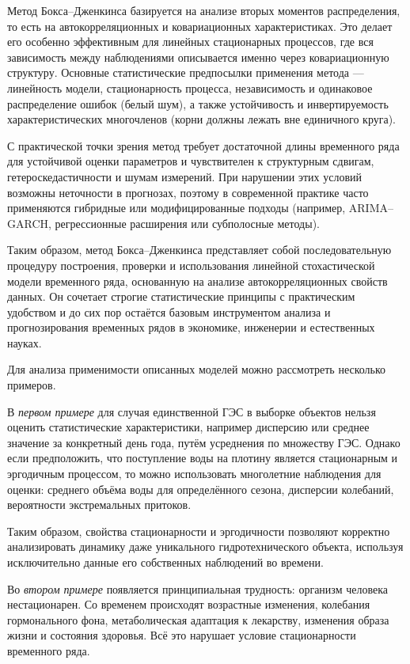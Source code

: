 Метод Бокса–Дженкинса базируется на анализе вторых моментов распределения, то есть на автокорреляционных и ковариационных характеристиках. Это делает его особенно эффективным для линейных стационарных процессов, где вся зависимость между наблюдениями описывается именно через ковариационную структуру. Основные статистические предпосылки применения метода — линейность модели, стационарность процесса, независимость и одинаковое распределение ошибок (белый шум), а также устойчивость и инвертируемость характеристических многочленов (корни должны лежать вне единичного круга).

С практической точки зрения метод требует достаточной длины временного ряда для устойчивой оценки параметров и чувствителен к структурным сдвигам, гетероскедастичности и шумам измерений. При нарушении этих условий возможны неточности в прогнозах, поэтому в современной практике часто применяются гибридные или модифицированные подходы (например, ARIMA–GARCH, регрессионные расширения или субполосные методы).

Таким образом, метод Бокса–Дженкинса представляет собой последовательную процедуру построения, проверки и использования линейной стохастической модели временного ряда, основанную на анализе автокорреляционных свойств данных. Он сочетает строгие статистические принципы с практическим удобством и до сих пор остаётся базовым инструментом анализа и прогнозирования временных рядов в экономике, инженерии и естественных науках.

Для анализа применимости описанных моделей можно рассмотреть несколько примеров.

В \textit{первом примере} для случая единственной ГЭС в выборке объектов нельзя оценить статистические характеристики, например дисперсию или среднее значение за конкретный день года, путём усреднения по множеству ГЭС. Однако если предположить, что поступление воды на плотину является стационарным и эргодичным процессом, то можно использовать многолетние наблюдения для оценки: среднего объёма воды для определённого сезона, дисперсии колебаний, вероятности экстремальных притоков.

Таким образом, свойства стационарности и эргодичности позволяют корректно анализировать динамику даже уникального гидротехнического объекта, используя исключительно данные его собственных наблюдений во времени.

Во \textit{втором примере} появляется принципиальная трудность: организм человека нестационарен. Со временем происходят возрастные изменения, колебания гормонального фона, метаболическая адаптация к лекарству, изменения образа жизни и состояния здоровья. Всё это нарушает условие стационарности временного ряда.

